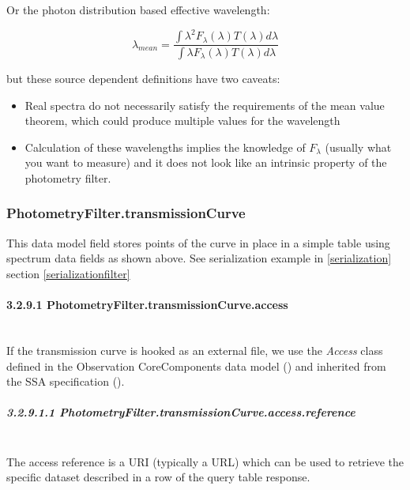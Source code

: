 \documentclass[11pt,a4paper]{ivoa}
\begin{document}
Or the photon distribution based effective wavelength:
\par
\[
\lambda_{mean} = \frac{\int \lambda^2 F_\lambda(\lambda)T(\lambda)d\lambda}{\int \lambda F_\lambda(\lambda)T(\lambda)d\lambda}
\]

but these source dependent definitions have two caveats:
\par

\begin{itemize}
	\item Real spectra do not necessarily satisfy the requirements of the mean value theorem, which could produce multiple values for the wavelength

	\item Calculation of these wavelengths implies the knowledge of $F_\lambda $ (usually what you want to measure) and it does not look like an intrinsic property of the photometry filter.
\end{itemize}\par

\subsubsection{PhotometryFilter.transmissionCurve}
This data model field stores points of the curve in place in a simple table using spectrum data fields as shown above. See serialization example in \ref{serialization} section \ref{serializationfilter} \par

\paragraph{3.2.9.1 PhotometryFilter.transmissionCurve.access} \hspace{0pt} \\
If the transmission curve is hooked as an external file, we use the \textit{Access} class defined in the Observation CoreComponents data model (\citep{louys2011ivoa}) and inherited from the SSA specification (\citep{2012ivoatody}).
\par

\subparagraph{3.2.9.1.1 PhotometryFilter.transmissionCurve.access.reference} \hspace{0pt} \\
The access reference is a URI (typically a URL) which can be used to retrieve the specific dataset described in a row of the query table response. \par
\end{document}
